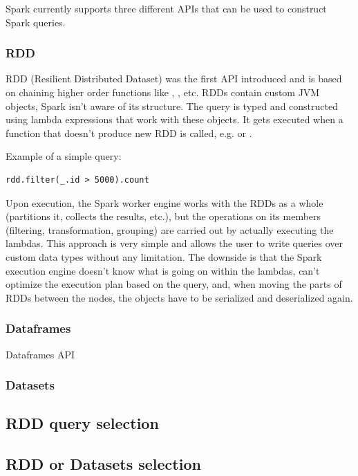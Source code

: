 Spark currently supports three different APIs that can be used to construct Spark queries.

\subsubsection{RDD}

RDD (Resilient Distributed Dataset) was the first API introduced and is based on chaining higher order functions like , , etc. RDDs contain custom JVM objects, Spark isn't aware of its structure. The query is typed and constructed using lambda expressions that work with these objects. It gets executed when a function that doesn't produce new RDD is called, e.g.  or . 

Example of a simple query:
\lstset{style=Scala}
\begin{lstlisting}
rdd.filter(_.id > 5000).count
\end{lstlisting}

Upon execution, the Spark worker engine works with the RDDs as a whole (partitions it, collects the results, etc.), but the operations on its members (filtering, transformation, grouping) are carried out by actually executing the lambdas. This approach is very simple and allows the user to write queries over custom data types without any limitation. The downside is that the Spark execution engine doesn't know what is going on within the lambdas, can't optimize the execution plan based on the query, and, when moving the parts of RDDs between the nodes, the objects have to be serialized and deserialized again.

\subsubsection{Dataframes}

Dataframes API 

\subsubsection{Datasets}
\subsection{RDD query selection}
\subsection{RDD or Datasets selection}
